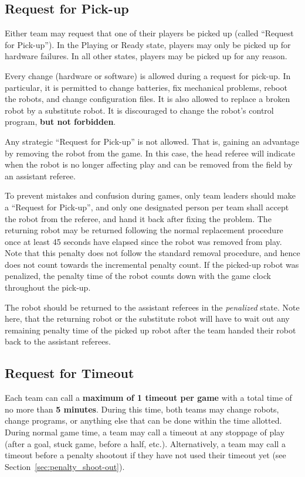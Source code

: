 \documentclass[12pt]{article}
\newcommand{\cf}{see\xspace}
\begin{document}
\subsection{Request for Pick-up}
\label{sec:request_for_pickup}

Either team may request that one of their players be picked up (called ``Request for Pick-up'').
In the Playing or Ready state, players may only be picked up for hardware failures.
In all other states, players may be picked up for any reason.

Every change (hardware or software) is allowed during a request for pick-up. In particular,
it is permitted to change batteries, fix mechanical problems, reboot the robots, and change configuration files.
It is also allowed to replace a broken robot by a substitute robot.
It is discouraged to change the robot's control program, \textbf{but not forbidden}.

Any strategic ``Request for Pick-up'' is not allowed.
That is, gaining an advantage by removing the robot from the game.
In this case, the head referee will indicate when the robot is no longer affecting play and can be removed from the field by an assistant referee.

To prevent mistakes and confusion during games, only team leaders should make a ``Request for Pick-up'', and only one designated person per team shall accept the robot from the referee, and hand it back after fixing the problem.
The returning robot may be returned following the normal replacement procedure once at least 45 seconds have elapsed since the robot was removed from play.
Note that this penalty does not follow the standard removal procedure, and hence does not count towards the incremental penalty count.
If the picked-up robot was penalized, the penalty time of the robot counts down with the game clock throughout the pick-up.

The robot should be returned to the assistant referees in the \emph{penalized} state.
Note here, that the returning robot or the substitute robot will have to wait out any remaining penalty time of the picked up robot after the team handed their robot back to the assistant referees.

\subsection{Request for Timeout}
\label{sec:request_for_timeout}

Each team can call a \textbf{maximum of 1 timeout per game} with a total time of no more than \textbf{5 minutes}. During this time, both teams may change robots, change programs, or anything else that can be done within the time allotted.  During normal game time, a team may call a timeout at any stoppage of play (after a goal, stuck game, before a half, etc.). Alternatively, a team may call a timeout before a penalty shootout if they have not used their timeout yet (\cf Section~\ref{sec:penalty_shoot-out}).
\end{document}
